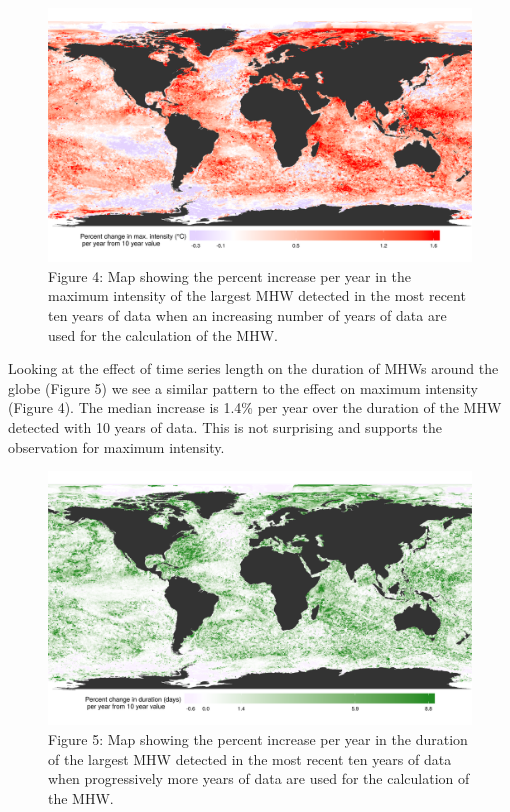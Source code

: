 \documentclass[]{article}
\begin{document}
{\begin{figure}
\centering
\includegraphics{../LaTeX/fig_4.png}
\caption{Figure 4: Map showing the percent increase per year in the
maximum intensity of the largest MHW detected in the most recent ten
years of data when an increasing number of years of data are used for
the calculation of the MHW.}
\end{figure}

Looking at the effect of time series length on the duration of MHWs
around the globe (Figure 5) we see a similar pattern to the effect on
maximum intensity (Figure 4). The median increase is 1.4\% per year over
the duration of the MHW detected with 10 years of data. This is not
surprising and supports the observation for maximum intensity.

\begin{figure}
\centering
\includegraphics{../LaTeX/fig_5.png}
\caption{Figure 5: Map showing the percent increase per year in the
duration of the largest MHW detected in the most recent ten years of
data when progressively more years of data are used for the calculation
of the MHW.}
\end{figure}

}
\end{document}
